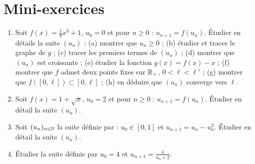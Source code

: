 \section{Mini-exercices}

\begin{frame}

\begin{miniexercice}
\begin{enumerate}

  \item Soit $f(x)=\frac19x^3+1$, $u_0=0$ et pour $n\ge0$ :
  $u_{n+1}=f(u_n)$. \'Etudier en détails la suite $(u_n)$ :
(a) montrer que $u_n\ge0$ ;
(b) étudier et tracer le graphe de $g$ ; 
(c) tracer les premiers termes de $(u_n)$ ;
(d) montrer que $(u_n)$ est croissante ; 
(e) étudier la fonction $g(x)=f(x)-x$ ;
(f) montrer que $f$ admet deux points fixes sur $\mathbb{R}_+$, $0 < \ell < \ell'$ ;
(g) montrer que $f([0,\ell]) \subset [0,\ell]$ ;
(h) en déduire que $(u_n)$ converge vers $\ell$.


  \item Soit $f(x)=1+\sqrt{x}$, $u_0= 2$ et pour $n\ge0$ :
  $u_{n+1}=f(u_n)$. \'Etudier en détail la suite $(u_n)$.


  \item Soit $(u_n)_{n\in\mathbb{N}}$ la suite définie par :
$u_0 \in[0,1]$ et $u_{n+1} = u_n - u_n^2$. \'Etudier en détail la suite $(u_n)$.

  \item \'Etudier la suite définie par $u_0=4$ et $u_{n+1}=\frac{4}{u_n+2}$.
  
\end{enumerate}
\end{miniexercice}

\end{frame}

